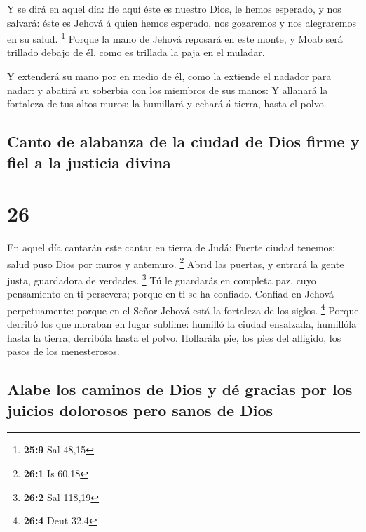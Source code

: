  Y se dirá en aquel día: He aquí éste es nuestro Dios, le
hemos esperado, y nos salvará: éste es Jehová á quien hemos esperado,
nos gozaremos y nos alegraremos en su salud. \footnote{\textbf{25:9} Sal
  48,15}  Porque la mano de Jehová reposará en este
monte, y Moab será trillado debajo de él, como es trillada la paja en el
muladar.

 Y extenderá su mano por en medio de él, como la extiende
el nadador para nadar: y abatirá su soberbia con los miembros de sus
manos:  Y allanará la fortaleza de tus altos muros: la
humillará y echará á tierra, hasta el polvo.

\hypertarget{canto-de-alabanza-de-la-ciudad-de-dios-firme-y-fiel-a-la-justicia-divina}{%
\subsection{Canto de alabanza de la ciudad de Dios firme y fiel a la
justicia
divina}\label{canto-de-alabanza-de-la-ciudad-de-dios-firme-y-fiel-a-la-justicia-divina}}

\hypertarget{section-25}{%
\section{26}\label{section-25}}

 En aquel día cantarán este cantar en tierra de Judá:
Fuerte ciudad tenemos: salud puso Dios por muros y antemuro. \footnote{\textbf{26:1}
  Is 60,18}  Abrid las puertas, y entrará la gente justa,
guardadora de verdades. \footnote{\textbf{26:2} Sal 118,19}
 Tú le guardarás en completa paz, cuyo pensamiento en ti
persevera; porque en ti se ha confiado.  Confiad en Jehová
perpetuamente: porque en el Señor Jehová está la fortaleza de los
siglos. \footnote{\textbf{26:4} Deut 32,4}  Porque derribó
los que moraban en lugar sublime: humilló la ciudad ensalzada, humillóla
hasta la tierra, derribóla hasta el polvo.  Hollarála pie,
los pies del afligido, los pasos de los menesterosos.

\hypertarget{alabe-los-caminos-de-dios-y-duxe9-gracias-por-los-juicios-dolorosos-pero-sanos-de-dios}{%
\subsection{Alabe los caminos de Dios y dé gracias por los juicios
dolorosos pero sanos de
Dios}\label{alabe-los-caminos-de-dios-y-duxe9-gracias-por-los-juicios-dolorosos-pero-sanos-de-dios}}

